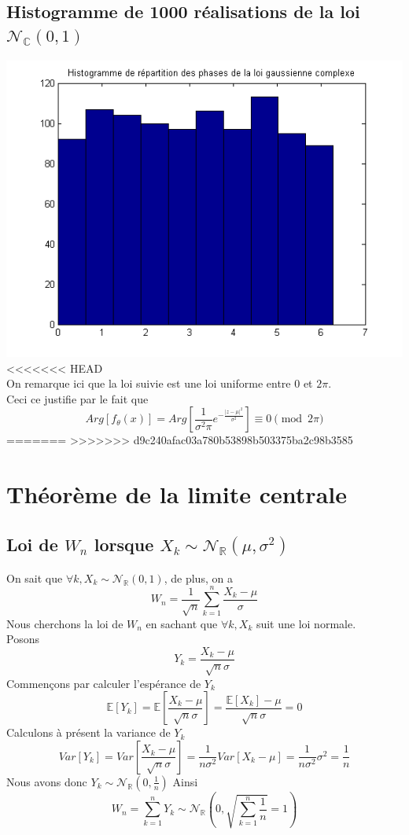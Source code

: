 \documentclass{report}
\begin{document}
		\subsection{Histogramme de 1000 réalisations de la loi $\mathcal{N}_{\mathbb{C}}(0, 1)$}
		\includegraphics[scale=0.7]{sources/Q232.png}
<<<<<<< HEAD
		\\
		On remarque ici que la loi suivie est une loi uniforme entre 0 et $2\pi$.\\
		Ceci ce justifie par le fait que 
		\[ Arg[f_\theta(x)] = Arg[ \frac{1}{\sigma^2\pi}e^{-\frac{|z-\mu|^2}{\sigma^2}} ] \equiv 0\pmod {2\pi} \]
=======
>>>>>>> d9c240afac03a780b53898b503375ba2c98b3585
	\section{Théorème de la limite centrale}
		\subsection{Loi de $W_n$ lorsque $X_k \sim \mathcal{N}_{\mathbb{R}}(\mu, \sigma^2)$}
			On sait que $\forall k, X_k \sim \mathcal{N}_{\mathbb{R}}(0, 1)$, de plus, on a 
			\[ W_n = \frac{1}{\sqrt{n}} \sum\limits_{k=1}^n \frac{X_k - \mu}{\sigma} \]
			Nous cherchons la loi de $W_n$ en sachant que $\forall k, X_k$ suit une loi normale. \\
			Posons 
			\[ Y_k = \frac{X_k - \mu}{\sqrt{n}\sigma} \]
			Commençons par calculer l'espérance de $Y_k$
			\[ \mathbb{E}[Y_k] = \mathbb{E}\left[ \frac{X_k - \mu}{\sqrt{n}\sigma} \right] = \frac{\mathbb{E}[X_k] - \mu}{\sqrt{n}\sigma} = 0 \]
			Calculons à présent la variance de $Y_k$
			\[ Var[Y_k] = Var\left[ \frac{X_k - \mu}{\sqrt{n}\sigma} \right] = \frac{1}{n\sigma^2}Var[X_k-\mu] = \frac{1}{n\sigma^2}\sigma^2 = \frac{1}{n} \]
			Nous avons donc $Y_k \sim \mathcal{N}_{\mathbb{R}}(0, \frac{1}n{})$
			Ainsi
			\[ W_n = \sum\limits_{k=1}^n Y_k \sim \mathcal{N}_{\mathbb{R}}(0, \sqrt{\sum\limits_{k=1}^n\frac{1}{n}} = 1) \]
\end{document}
